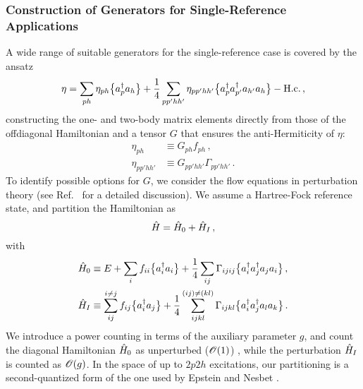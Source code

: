 {\subsubsection{\label{sec:imsrg_generator_general}Construction of Generators for Single-Reference Applications}
A wide range of suitable generators for the single-reference case
is covered by the ansatz
\begin{equation}
  \eta= \sum_{ph} \eta_{ph}\big\{a^\dag_{p}a_{h}\big\}
        +\frac{1}{4}\sum_{pp'hh'} \eta_{pp'hh'}\big\{a^\dag_{p}a^\dag_{p'}a_{h'}a_{h}\big\} - \text{H.c.}\,,
\end{equation}
constructing the one- and two-body matrix elements directly from those
of the offdiagonal Hamiltonian and a tensor $G$ that ensures the 
anti-Hermiticity of $\eta$:
\begin{align}
  \eta_{ph}     &\equiv G_{ph} f_{ph}\,,\\
  \eta_{pp'hh'} &\equiv G_{pp'hh'} \Gamma_{pp'hh'}\,.
\end{align}
To identify possible options for $G$, we consider the flow
equations in perturbation theory (see Ref.~\cite{Hergert:2016jk}
for a detailed discussion). We assume a Hartree-Fock reference state,
and partition the Hamiltonian as
\begin{equation}
  \hat{H} = \hat{H}_0 + \hat{H}_I\,,
\end{equation}
with 
\begin{align}
  \hat{H}_0 &\equiv E + \sum_{i} f_{ii}\big\{a^\dag_{i}a_{i}\big\}
                 + \frac{1}{4} \sum_{ij} \Gamma_{ijij}\big\{a^\dag_{i}a^\dag_{j}a_{j}a_{i}\big\}\,,\\
  \hat{H}_I &\equiv \sum_{ij}^{i\neq j} f_{ij}\big\{a^\dag_{i}a_{j}\big\} 
                 + \frac{1}{4} \sum_{ijkl}^{(ij)\neq (kl)} \Gamma_{ijkl}\big\{a^\dag_{i}a^\dag_{j}a_{l}a_{k}\big\}\,.
\end{align}
We introduce a power counting in terms of the auxiliary parameter
$g$, and count the diagonal Hamiltonian $\hat{H}_0$ as unperturbed ($\mathcal{O}(1)$)
, while the perturbation $\hat{H}_I$ is counted as $\mathcal{O}(g)$. In the space of 
up to $2p2h$ excitations, our partitioning is a second-quantized form of 
the one used by Epstein and Nesbet \cite{Epstein:1926fp,Nesbet:1955lq}.

}
